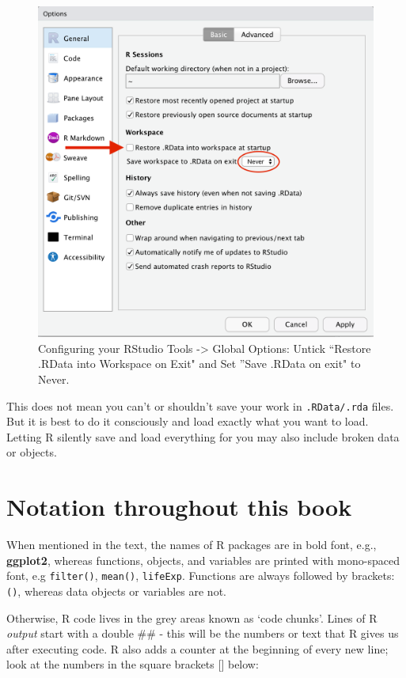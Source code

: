 \documentclass[
  12pt,
  krantz2]{krantz}
\begin{document}
\begin{figure}
\includegraphics[width=1\linewidth]{images/chapter01/rstudio_settings} \caption{Configuring your RStudio Tools -> Global Options:  Untick ``Restore .RData into Workspace on Exit" and Set ''Save .RData on exit" to Never.}\label{fig:chap01-fig-settings}
\end{figure}

This does not mean you can't or shouldn't save your work in \texttt{.RData/.rda} files.
But it is best to do it consciously and load exactly what you want to load.
Letting R silently save and load everything for you may also include broken data or objects.

\hypertarget{notation-throughout-this-book}{%
\section{Notation throughout this book}\label{notation-throughout-this-book}}

When mentioned in the text, the names of R packages are in bold font, e.g., \textbf{ggplot2}, whereas functions, objects, and variables are printed with mono-spaced font, e.g \texttt{filter()}, \texttt{mean()}, \texttt{lifeExp}. Functions are always followed by brackets: \texttt{()}, whereas data objects or variables are not.

Otherwise, R code lives in the grey areas known as `code chunks'.
Lines of R \emph{output} start with a double \#\# - this will be the numbers or text that R gives us after executing code.
R also adds a counter at the beginning of every new line; look at the numbers in the square brackets {[}{]} below:
\end{document}
